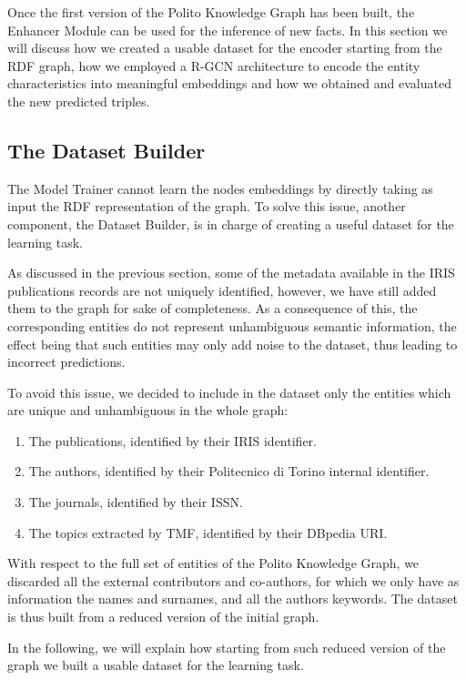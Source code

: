 \documentclass[%
    corpo=13.5pt,
    twoside,
    oldstyle,
    tipotesi=magistrale,
    greek,
    evenboxes
]{toptesi}
\begin{document}
Once the first version of the Polito Knowledge Graph has been built, the
Enhancer Module can be used for the inference of new facts. In this section we
will discuss how we created a usable dataset for the encoder starting from the
RDF graph, how we employed a R-GCN architecture to encode the entity
characteristics into meaningful embeddings and how we obtained and evaluated the
new predicted triples.


\subsection{The Dataset Builder}

The Model Trainer cannot learn the nodes embeddings by directly taking as input
the RDF representation of the graph.
To solve this issue, another component, the Dataset Builder, is in charge of
creating a useful dataset for the learning task.

As discussed in the previous section, some of the metadata available
in the IRIS publications records are not uniquely identified, however, we
have still added them to the graph for sake of completeness.
As a consequence of this, the corresponding entities do not represent
unhambiguous semantic information, the effect being that such entities may
only add noise to the dataset, thus leading to incorrect predictions.

To avoid this issue, we decided to include in the dataset only the entities
which are unique and unhambiguous in the whole graph:

\begin{enumerate}
    \item The publications, identified by their IRIS identifier.
    \item The authors, identified by their Politecnico di
        Torino internal identifier.
    \item The journals, identified by their ISSN.
    \item The topics extracted by TMF, identified by their DBpedia
        URI.
\end{enumerate}

With respect to the full set of entities of the Polito Knowledge Graph, we
discarded all the external contributors and co-authors, for which we only have
as information the names and surnames, and all the authors keywords.
The dataset is thus built from a reduced version of the initial graph.

In the following, we will explain how starting from such reduced version of the
graph we built a usable dataset for the learning task.
\newline
\end{document}
